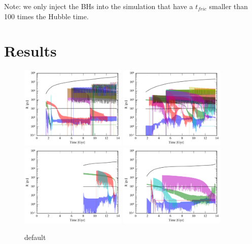 \documentclass[english, apj]{emulateapj}
\begin{document}
Note: we only inject the BHs into the simulation that have a $t_{fric}$ smaller than 100 times the Hubble time.


\section{Results}\label{sec:results}
\begin{figure}[htbp]
\begin{center}
\includegraphics[width=0.45\textwidth]{plots/radius_A.png}
\includegraphics[width=0.45\textwidth]{plots/radius_B.png}\\
\includegraphics[width=0.45\textwidth]{plots/radius_C.png}
\includegraphics[width=0.45\textwidth]{plots/radius_D.png}\\
\caption{default}
\label{default}
\end{center}
\end{figure}
\end{document}
